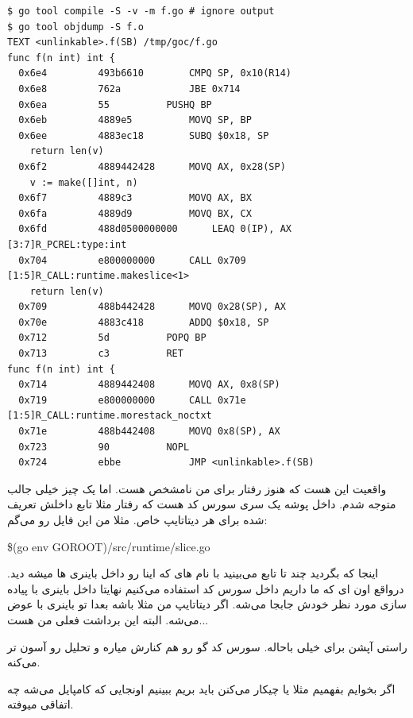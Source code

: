 \begin{latin}
\begin{verbatim}
$ go tool compile -S -v -m f.go # ignore output
$ go tool objdump -S f.o
TEXT <unlinkable>.f(SB) /tmp/goc/f.go
func f(n int) int {
  0x6e4         493b6610        CMPQ SP, 0x10(R14)  
  0x6e8         762a            JBE 0x714       
  0x6ea         55          PUSHQ BP        
  0x6eb         4889e5          MOVQ SP, BP     
  0x6ee         4883ec18        SUBQ $0x18, SP      
    return len(v)
  0x6f2         4889442428      MOVQ AX, 0x28(SP)   
    v := make([]int, n)
  0x6f7         4889c3          MOVQ AX, BX     
  0x6fa         4889d9          MOVQ BX, CX     
  0x6fd         488d0500000000      LEAQ 0(IP), AX      [3:7]R_PCREL:type:int           
  0x704         e800000000      CALL 0x709      [1:5]R_CALL:runtime.makeslice<1>    
    return len(v)
  0x709         488b442428      MOVQ 0x28(SP), AX   
  0x70e         4883c418        ADDQ $0x18, SP      
  0x712         5d          POPQ BP         
  0x713         c3          RET         
func f(n int) int {
  0x714         4889442408      MOVQ AX, 0x8(SP)    
  0x719         e800000000      CALL 0x71e      [1:5]R_CALL:runtime.morestack_noctxt    
  0x71e         488b442408      MOVQ 0x8(SP), AX    
  0x723         90          NOPL            
  0x724         ebbe            JMP <unlinkable>.f(SB)  
\end{verbatim}
\end{latin}

واقعیت این هست که هنوز رفتار  برای من نامشخص هست. اما یک چیز خیلی جالب متوجه شدم. داخل پوشه  یک سری سورس کد هست
که رفتار مثلا تابع  داخلش تعریف شده برای هر دیتاتایپ خاص. مثلا من این فایل رو می‌گم:‌

\begin{latin}
\$(go env GOROOT)/src/runtime/slice.go
\end{latin}

اینجا که بگردید چند تا تابع می‌بینید با نام های  که اینا رو داخل باینری ها میشه دید. درواقع
اون  ای که ما داریم داخل سورس کد استفاده می‌کنیم نهایتا داخل باینری با پیاده سازی مورد نظر خودش جابجا می‌شه. اگر دیتاتایپ من
مثلا  باشه بعدا تو باینری با  عوض می‌شه. البته این برداشت فعلی من هست...

راستی آپشن  برای  خیلی باحاله. سورس کد گو رو هم کنارش میاره و تحلیل رو آسون تر می‌کنه.

اگر بخوایم بفهمیم مثلا  یا  چیکار می‌کنن باید بریم ببینیم اونجایی که کامپایل می‌شه چه اتفاقی میوفته.

